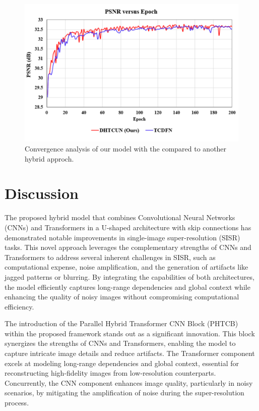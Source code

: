 \documentclass{ieeeaccess}
\begin{document}
\begin{figure}
  \includegraphics[width=\linewidth]{21FIGURE.pdf}
  \caption{Convergence analysis of our model with the compared to another hybrid approch.}
  \label{fig:21}
\end{figure}




\section{Discussion}

The proposed hybrid model that combines Convolutional Neural Networks (CNNs) and Transformers in a U-shaped architecture with skip connections has demonstrated notable improvements in single-image super-resolution (SISR) tasks. This novel approach leverages the complementary strengths of CNNs and Transformers to address several inherent challenges in SISR, such as computational expense, noise amplification, and the generation of artifacts like jagged patterns or blurring. By integrating the capabilities of both architectures, the model efficiently captures long-range dependencies and global context while enhancing the quality of noisy images without compromising computational efficiency.

The introduction of the Parallel Hybrid Transformer CNN Block (PHTCB) within the proposed framework stands out as a significant innovation. This block synergizes the strengths of CNNs and Transformers, enabling the model to capture intricate image details and reduce artifacts. The Transformer component excels at modeling long-range dependencies and global context, essential for reconstructing high-fidelity images from low-resolution counterparts. Concurrently, the CNN component enhances image quality, particularly in noisy scenarios, by mitigating the amplification of noise during the super-resolution process.
\end{document}
